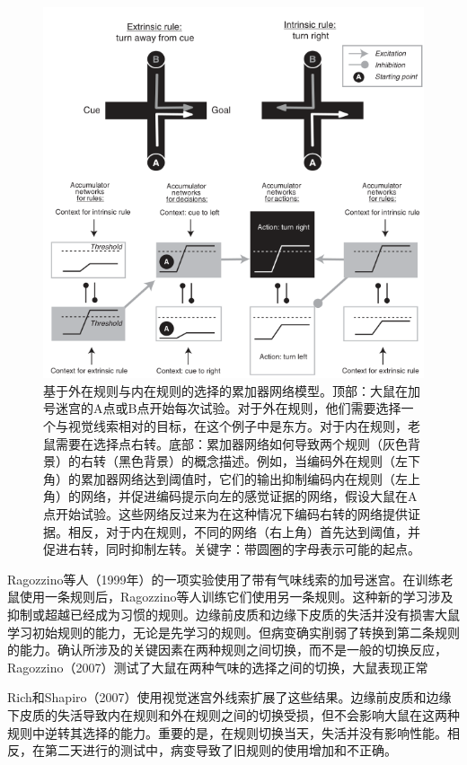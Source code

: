 \begin{figure}[!htb]
	\centering
	\includegraphics{image_pfc/Fig_3_6}
	\caption{基于外在规则与内在规则的选择的累加器网络模型。顶部：大鼠在加号迷宫的A点或B点开始每次试验。对于外在规则，他们需要选择一个与视觉线索相对的目标，在这个例子中是东方。对于内在规则，老鼠需要在选择点右转。底部：累加器网络如何导致两个规则（灰色背景）的右转（黑色背景）的概念描述。例如，当编码外在规则（左下角）的累加器网络达到阈值时，它们的输出抑制编码内在规则（左上角）的网络，并促进编码提示向左的感觉证据的网络，假设大鼠在A点开始试验。这些网络反过来为在这种情况下编码右转的网络提供证据。相反，对于内在规则，不同的网络（右上角）首先达到阈值，并促进右转，同时抑制左转。关键字：带圆圈的字母表示可能的起点。}
	\label{fig:fig}
\end{figure}
Ragozzino等人（1999年）的一项实验使用了带有气味线索的加号迷宫。在训练老鼠使用一条规则后，Ragozzino等人训练它们使用另一条规则。这种新的学习涉及抑制或超越已经成为习惯的规则。边缘前皮质和边缘下皮质的失活并没有损害大鼠学习初始规则的能力，无论是先学习的规则。但病变确实削弱了转换到第二条规则的能力。确认所涉及的关键因素在两种规则之间切换，而不是一般的切换反应，Ragozzino（2007）测试了大鼠在两种气味的选择之间的切换，大鼠表现正常\par
Rich和Shapiro（2007）使用视觉迷宫外线索扩展了这些结果。边缘前皮质和边缘下皮质的失活导致内在规则和外在规则之间的切换受损，但不会影响大鼠在这两种规则中逆转其选择的能力。重要的是，在规则切换当天，失活并没有影响性能。相反，在第二天进行的测试中，病变导致了旧规则的使用增加和不正确。\par
